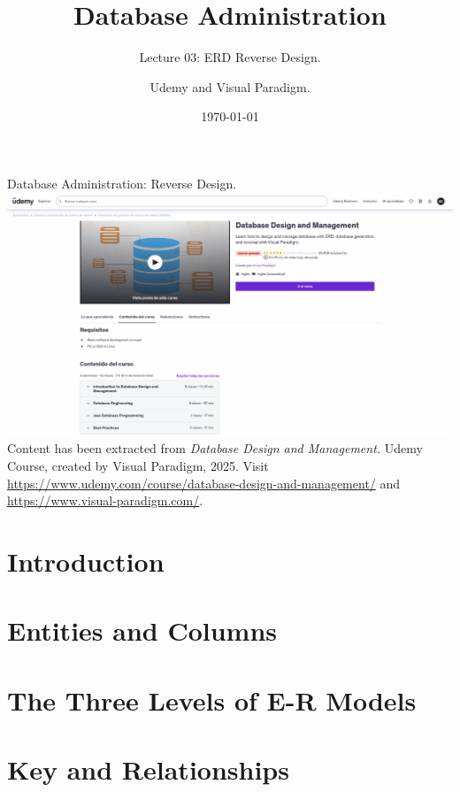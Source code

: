 \documentclass{beamer}
\title[Reverse Design]{Database Administration}
\subtitle{Lecture 03: ERD Reverse Design.}
\author{Udemy and Visual Paradigm.}
\date{\today}
\begin{document}
\frame{\titlepage}

\begin{frame}{Database Administration: Reverse Design.}
    \centering
    \includegraphics[width=\textwidth]{figures/udemy2}\\
    \includegraphics[width=\textwidth]{figures/udemy3}\\
    \vspace{2mm}
    {
        \scriptsize
        Content has been extracted from \textit{Database Design and Management.} Udemy Course, created by Visual Paradigm, 2025.  Visit \url{https://www.udemy.com/course/database-design-and-management/} and \url{https://www.visual-paradigm.com/}.\\
    }
\end{frame}

\section{Introduction}


\section{Entities and Columns}


\section{The Three Levels of E-R Models}


\section{Key and Relationships}

\end{document}

